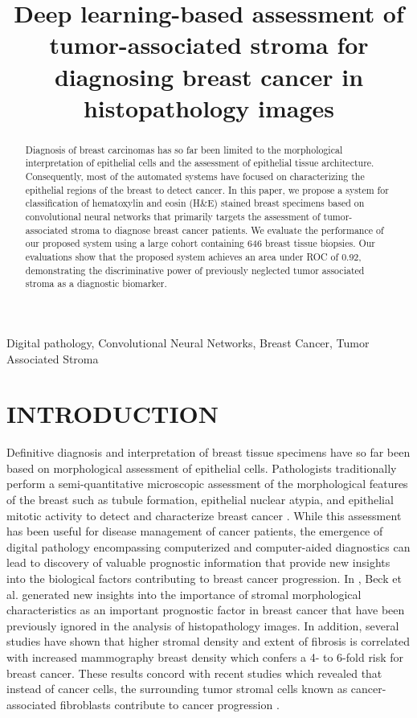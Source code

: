\documentclass{article}
\title{Deep learning-based assessment of tumor-associated stroma for diagnosing breast cancer in histopathology images}
\begin{document}
\maketitle
\begin{abstract}
Diagnosis of breast carcinomas has so far been limited to the morphological interpretation of epithelial cells and the assessment of epithelial tissue architecture. Consequently, most of the automated systems have focused on characterizing the epithelial regions of the breast to detect cancer.  In this paper,  we propose a system for classification of hematoxylin and eosin (H\&E) stained breast specimens based on convolutional neural networks that primarily targets the assessment of tumor-associated stroma to diagnose breast cancer patients. We evaluate the performance of our proposed system using a large cohort containing 646 breast tissue biopsies. Our evaluations show that the proposed system achieves an area under ROC of 0.92, demonstrating the discriminative power of previously neglected tumor associated stroma as a diagnostic biomarker.
\end{abstract}
%
\begin{keywords}
Digital pathology, Convolutional Neural Networks, Breast Cancer, Tumor Associated Stroma
\end{keywords}
%
\section{INTRODUCTION}
\label{sec:intro}

Definitive diagnosis and interpretation of breast tissue specimens have so far been based on morphological assessment of epithelial cells. Pathologists traditionally perform a semi-quantitative microscopic assessment of the morphological features of the breast such as tubule formation, epithelial nuclear atypia, and epithelial mitotic activity to detect and characterize breast cancer \cite{PATEY28}. While this assessment has been useful for disease management of cancer patients, the emergence of digital pathology encompassing computerized and computer-aided diagnostics can lead to discovery of valuable prognostic information that provide new insights into the biological factors contributing to breast cancer progression. In \cite{beck2011}, Beck et al. generated new insights into the importance of stromal morphological characteristics as an important prognostic factor in breast cancer that have been previously ignored in the analysis of histopathology images. \iffalse In that study, the scores of the proposed prognostic model were shown to be strongly associated with overall survival of breast cancer patients.\fi In addition, several studies have shown that higher stromal density and extent of fibrosis is correlated with increased mammography breast density \cite{sun2013} which confers a 4- to 6-fold risk for breast cancer. These results concord with recent studies which revealed that instead of cancer cells, the surrounding tumor stromal cells known as cancer-associated fibroblasts contribute to cancer progression \cite{shiga2015, kalluri2006}.
\end{document}
